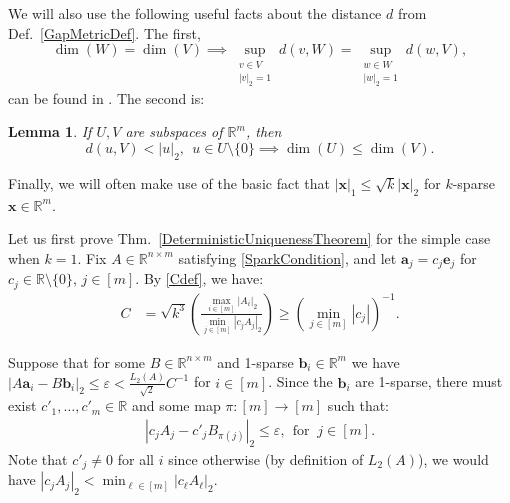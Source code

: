 \documentclass[journal, twocolumn]{IEEEtran}
\newtheorem{lemma}{Lemma}
\begin{document}
We will also use the following useful facts about the distance $d$ from Def.~\ref{GapMetricDef}. The first, 
\begin{equation}\label{SubspaceMetricSameDim}
\dim(W) = \dim(V) \implies \sup_{\substack{v \in V \\ |v|_2 = 1}}  d(v,W)  = \sup_{\substack{w \in W \\ |w|_2 = 1}} d(w,V),
\end{equation}
can be found in \cite[Lem.~3.3]{Morris10}. The second is:
\begin{lemma}\label{MinDimLemma}
If $U, V$ are subspaces of $\mathbb{R}^{m}$, then
\begin{equation*}
d(u,V) < |u|_2, \ \ u \in U \setminus{\{0\}} \implies \dim(U) \leq \dim(V).
\end{equation*}
\end{lemma}
Finally, we will often make use of the basic fact that $|\mathbf{x}|_1 \leq \sqrt{k} |\mathbf{x}|_2$ for $k$-sparse $\mathbf{x} \in \mathbb{R}^m$.

Let us first prove Thm.~\ref{DeterministicUniquenessTheorem} for the simple case when $k=1$. Fix $A \in \mathbb{R}^{n \times m}$ satisfying \eqref{SparkCondition}, and let $\mathbf{a}_j = c_j \mathbf{e}_j$ for $c_j \in \mathbb{R} \setminus \{0\}$, $j \in [m]$. By \eqref{Cdef}, we have:
\begin{align}\label{C1}
C 
&= \sqrt{k^3} \left( \frac{\max_{i \in [m]} |A_i|_2}{\min_{j \in [m]}|c_jA_j|_2} \right)
\geq \left( \min_{j \in [m]} |c_j| \right)^{-1}.
\end{align}

Suppose that for some $B \in \mathbb{R}^{n \times m}$ and 1-sparse $\mathbf{b}_i \in \mathbb{R}^m$ we have  $|A\mathbf{a}_i - B\mathbf{b}_i|_2 \leq \varepsilon < \frac{L_2(A)}{\sqrt{2}}C^{-1}$ for $i \in [m]$. Since the $\mathbf{b}_i$ are 1-sparse, there must exist $c'_1, \ldots, c'_m \in \mathbb{R}$ and some map $\pi: [m] \to [m]$ such that:
\begin{align}\label{1D}
|c_jA_j - c'_jB_{\pi(j)}|_2 \leq \varepsilon, \ \ \text{for } \  j \in [m].
\end{align} 
Note that $c'_j \neq 0$ for all $i$ since otherwise (by definition of $L_2(A)$), we would have $|c_jA_j|_2 < \min_{\ell \in [m]}|c_{\ell}A_{\ell}|_2$. 
\end{document}

